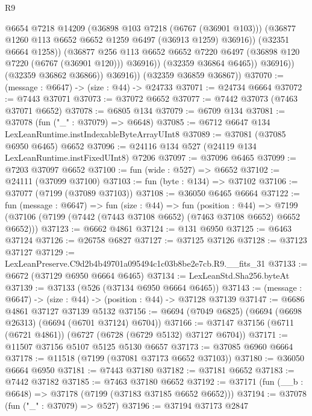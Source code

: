 \begin{lexlean}{R9}
\begin{coremodule}
                        @6654
                        @7218
                        @14209
                        (@36898 @103 @7218 (@6767 (@36901 @103)))
                        (@36877 @1260 @113 @6652 @6652 @1259 @6497 (@36913 @1259) @36916))
                      (@32351 @6664 @1258))
                    (@36877
                      @256
                      @113
                      @6652
                      @6652
                      @7220
                      @6497
                      (@36898 @120 @7220 (@6767 (@36901 @120)))
                      @36916))
                  (@32359 @36864 @6465))
                @36916))
            (@32359 @36862 @36866))
          @36916))
      (@32359 @36859 @36867))
@37070 := (message : @6647) -> (size : @44) -> @24733
@37071 := @24734 @6664
@37072 := @7443 @37071
@37073 := @37072 @6652
@37077 := @7442 @37073 (@7463 @37071 @6652)
@37078 := @6805 @134
@37079 := @6709 @134
@37081 := @37078 (fun ("_" : @37079) => @6648)
@37085 := @6712 @6647 @134 LexLeanRuntime.instIndexableByteArrayUInt8
@37089 := @37081 (@37085 @6950 @6465) @6652
@37096 := @24116 @134 @527 (@24119 @134 LexLeanRuntime.instFixedUInt8) @7206
@37097 := @37096 @6465
@37099 := @7203 @37097 @6652
@37100 := fun (wide : @527) => @6652
@37102 := @24111 (@37099 @37100)
@37103 := fun (byte : @134) => @37102
@37106 := @37077 (@7199 (@37089 @37103))
@37108 := @36050 @6465 @6664
@37122 := fun (message : @6647) =>
  fun (size : @44) =>
  fun (position : @44) =>
  @7199 (@37106 (@7199 (@7442 (@7443 @37108 @6652) (@7463 @37108 @6652) @6652 @6652)))
@37123 := @6662 @4861
@37124 := @131 @6950
@37125 := @6463 @37124
@37126 := @26758 @6827
@37127 := @37125 @37126
@37128 := @37123 @37127
@37129 := LexLeanPreserve.C9d2b4b49701a095494c1c03b8be2e7cb.R9.__fits_31
@37133 := @6672 (@37129 @6950 @6664 @6465)
@37134 := LexLeanStd.Sha256.byteAt
@37139 := @37133 (@526 (@37134 @6950 @6664 @6465))
@37143 := (message : @6647) -> (size : @44) -> (position : @44) -> @37128 @37139
@37147 := @6686 @4861 @37127 @37139 @5132
@37156 := @6694 (@7049 @6825) (@6694 (@6698 @26313) (@6694 (@6701 @37124) @6704))
@37166 := @37147 @37156 (@6711 (@6721 @4861)) (@6727 (@6728 (@6729 @5132) @37127 @6704))
@37171 := @11507 @37156 @5107 @5125 @5130 @6657
@37173 := @37085 @6960 @6664
@37178 := @11518 (@7199 (@37081 @37173 @6652 @37103))
@37180 := @36050 @6664 @6950
@37181 := @7443 @37180
@37182 := @37181 @6652
@37183 := @7442 @37182
@37185 := @7463 @37180 @6652
@37192 := @37171 (fun (__b : @6648) => @37178 (@7199 (@37183 @37185 @6652 @6652)))
@37194 := @37078 (fun ("_" : @37079) => @527)
@37196 := @37194 @37173 @2847

\end{coremodule}
\end{lexlean}

